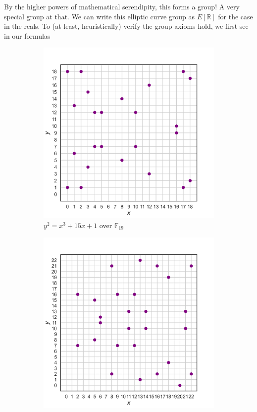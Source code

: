 \documentclass[11pt, a4paper]{report}
\newcommand{\reals}{\mathbb{R}}
\newcommand{\field}{\mathbb{F}}
\begin{document}
By the higher powers of mathematical serendipity, this forms a group! A very special group at that. We can write this elliptic curve group as $E[\reals]$ for the case in the reals. To (at least, heuristically) verify the group axioms hold, we first see in our formulas





\begin{figure}[ht]
\centering
\begin{subfigure}{0.49\textwidth}
\centering
\includegraphics[width = \textwidth]{krationalpoints19.png}
\caption{$y^2 = x^3 + 15x + 1$ over $\field_{19}$}
\label{fig:left}
\end{subfigure}
\begin{subfigure}{0.49\textwidth}
\centering
\includegraphics[width = \textwidth]{krationalpoints23.png}

\end{subfigure}
\end{figure}
\end{document}
